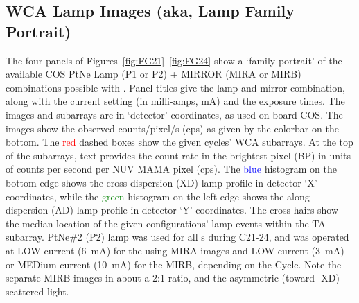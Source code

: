 \subsection{WCA Lamp Images (aka, Lamp Family Portrait) \label{subsec:fportrait} }
\normalsize
The four panels of Figures~\ref{fig:FG21}--\ref{fig:FG24} show a `family portrait' of the available COS PtNe Lamp (P1 or P2) + MIRROR (MIRA or MIRB)
combinations possible with .
Panel titles give the lamp and mirror combination, along with the current setting (in milli-amps, mA) and the exposure times.
The images and subarrays are in `detector' coordinates, as used on-board COS.
The images show the observed counts/pixel/s (cps) as given by the colorbar on the bottom.
The \textcolor{red}{red} dashed boxes show the given cycles'  WCA subarrays. At the top of the subarrays, text provides the count rate in the brightest pixel (BP) in units of counts per second per NUV MAMA pixel (cps).
The \textcolor{blue}{blue} histogram on the bottom edge shows the cross-dispersion (XD) lamp profile in detector `X' coordinates, while
the \textcolor{green}{green} histogram on the left edge shows the along-dispersion (AD) lamp profile in detector `Y' coordinates.
The cross-hairs show the median location of the given configurations' lamp events within the TA subarray.
PtNe\#2 (P2) lamp was used for all s during C21-24, and was operated at LOW current (6~mA) for the using MIRA images
and LOW current (3~mA) or MEDium current (10~mA) for the MIRB, depending on the Cycle. Note the separate MIRB images in about a 2:1 ratio, and the asymmetric
(toward -XD) scattered light.

